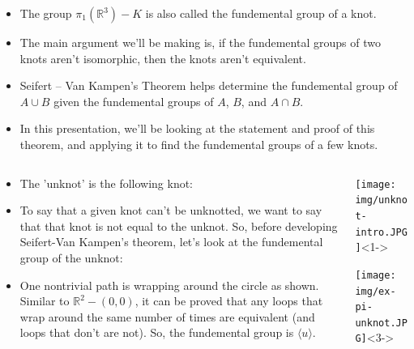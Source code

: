 \documentclass[8pt]{beamer}
\begin{document}
\begin{frame}
\begin{columns}
\begin{column}[T]{0.5\textwidth}
\begin{itemize}
          \item<5->
            The group $\pi_1(\mathbb{R}^3) - K$ is also called the fundemental
            group of a knot.

          \item<6->
            The main argument we'll be making is, if the fundemental groups of
            two knots aren't isomorphic, then the knots aren't equivalent.

          \item<7->
            Seifert -- Van Kampen's Theorem helps determine the fundemental
            group of $A \cup B$ given the fundemental groups of $A$, $B$, and
            $A \cap B$.

          \item<8->
            In this presentation, we'll be looking at the statement and proof
            of this theorem, and applying it to find the fundemental groups of a
            few knots.
        \end{itemize}
      \end{column}
    \end{columns}
  \end{frame}
  \begin{frame}
    \begin{columns}
      \begin{column}[T]{0.5\textwidth}
        \begin{itemize}
          \item<1-> The 'unknot' is the following knot:
          \item<2-> To say that a given knot can't be unknotted, we want to say
            that that knot is not equal to the unknot. So, before developing
            Seifert-Van Kampen's theorem, let's look at the fundemental group of
            the unknot:
          \item<3-> One nontrivial path is wrapping around the circle as shown.
            Similar to $\mathbb{R}^2-(0,0)$, it can be proved that any loops
            that wrap around the same number of times are equivalent (and loops
            that don't are not). So, the fundemental group is $\langle u\rangle $.
        \end{itemize}
      \end{column}
      \begin{column}[T]{0.5\textwidth}
        \begin{center}
          \texttt{[image: img/unknot-intro.JPG]}<1->
        \end{center}
        \begin{center}
          \texttt{[image: img/ex-pi-unknot.JPG]}<3->
        \end{center}
      \end{column}
    \end{columns}
  \end{frame}
\end{document}

